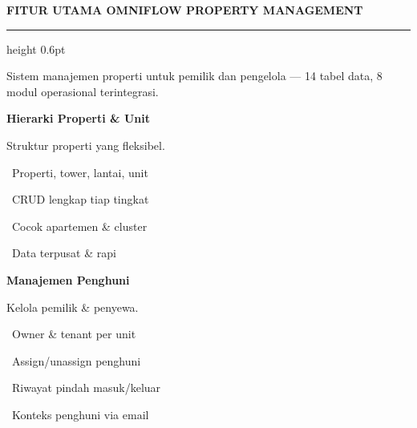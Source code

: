 \documentclass[a4paper]{article}
\newcommand{\sectiontitle}[1]{%
    \vspace{10pt}%
    {\fontsize{13}{16}\selectfont\bfseries\color{BlueDark} #1}\par\vspace{3pt}%
    {\color{BluePrimary}\hrule height 0.6pt}\par\vspace{8pt}%
}
\begin{document}
\sectiontitle{FITUR UTAMA OMNIFLOW PROPERTY MANAGEMENT}

{\fontsize{9.5}{13}\selectfont\color{TextLight} Sistem manajemen properti untuk pemilik dan pengelola --- 14 tabel data, 8 modul operasional terintegrasi.}

\vspace{6pt}

\noindent
\begin{minipage}[t]{0.485\textwidth}
    \colorbox{BluePrimary}{%
        \begin{minipage}{\dimexpr\textwidth-2\fboxsep\relax}
            {\fontsize{10}{13}\selectfont\bfseries\color{White} Hierarki Properti \& Unit}
        \end{minipage}}\par
    \vspace{4pt}
    {\fontsize{9}{12}\selectfont\color{TextDark}%
    Struktur properti yang fleksibel.\par\vspace{3pt}
    \textbullet\ Properti, tower, lantai, unit\par\vspace{2pt}%
    \textbullet\ CRUD lengkap tiap tingkat\par\vspace{2pt}%
    \textbullet\ Cocok apartemen \& cluster\par\vspace{2pt}%
    \textbullet\ Data terpusat \& rapi}%

\end{minipage}%
\hfill
\begin{minipage}[t]{0.485\textwidth}
    \colorbox{EmeraldPrimary}{%
        \begin{minipage}{\dimexpr\textwidth-2\fboxsep\relax}
            {\fontsize{10}{13}\selectfont\bfseries\color{White} Manajemen Penghuni}
        \end{minipage}}\par
    \vspace{4pt}
    {\fontsize{9}{12}\selectfont\color{TextDark}%
    Kelola pemilik \& penyewa.\par\vspace{3pt}
    \textbullet\ Owner \& tenant per unit\par\vspace{2pt}%
    \textbullet\ Assign/unassign penghuni\par\vspace{2pt}%
    \textbullet\ Riwayat pindah masuk/keluar\par\vspace{2pt}%
    \textbullet\ Konteks penghuni via email}%

\end{minipage}
\end{document}

